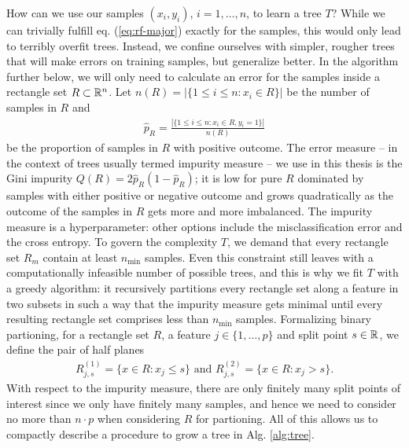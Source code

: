 How can we use our samples $(x_i, y_i)$, $i = 1, \ldots, n$, to learn a tree $T$? While we can 
trivially fulfill eq. (\ref{eq:rf-major}) exactly for the samples, this would only lead to terribly 
overfit trees. Instead, we confine ourselves with simpler, rougher trees that will make errors on 
training samples, but generalize better. 
In the algorithm further below, we will only need to calculate an error for the samples inside a 
rectangle set $R \subset \mathbb{R}^n$. Let $n(R) = |\{ 1 \leq i \leq n: x_i \in R \}|$ be the number of 
samples in $R$ and
\begin{align}
    \hat{p}_R = \frac{|\{ 1 \leq i \leq n: x_i \in R, y_i = 1 \}|}{n(R)}
\end{align}
be the proportion of samples in $R$ with positive outcome. The error measure -- in the context of 
trees usually termed impurity measure -- we use in this thesis
is the Gini impurity $Q(R) = 2 \hat{p}_R (1 - \hat{p}_R)$; it is low for pure $R$ dominated by 
samples with either positive or negative outcome and grows quadratically as the outcome of the 
samples in $R$ gets more and more imbalanced. The impurity measure is a hyperparameter: other 
options include the misclassification error and the cross entropy. To govern the complexity $T$,
we demand that every rectangle set $R_m$ contain at least $n_\text{min}$ samples. Even this 
constraint still leaves with a computationally infeasible number of possible trees, and this is 
why we fit $T$ with a greedy algorithm: it recursively partitions every rectangle set along a 
feature in two subsets in such a way that the impurity measure gets minimal until every resulting 
rectangle set comprises less than $n_\text{min}$ samples. Formalizing binary partioning, for a 
rectangle set $R$, a feature $j \in \{1, \ldots, p\}$ and split point $s \in \mathbb{R}$, we define 
the pair of half planes
\begin{align}
    R^{(1)}_{j, s} = \{x \in R: x_j \leq s\} \text{ and } R^{(2)}_{j, s} = \{x \in R: x_j > s\}.
\end{align}
With respect to the impurity measure, there are only finitely many split points of interest since 
we only have finitely many samples, and hence we need to consider no more than $n \cdot p$ when 
considering $R$ for partioning. All of this allows us to compactly describe a procedure to grow a 
tree in Alg. \ref{alg:tree}.



